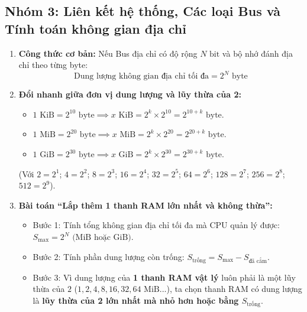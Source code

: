 \subsection{Nhóm 3: Liên kết hệ thống, Các loại Bus và Tính toán không gian địa chỉ}

\begin{tcolorbox}[bwbox, title=Quy trình giải các bài toán về Độ rộng Bus địa chỉ và Dung lượng RAM]
\begin{enumerate}
    \item \textbf{Công thức cơ bản:} Nếu Bus địa chỉ có độ rộng $N\text{ bit}$ và bộ nhớ đánh địa chỉ theo từng byte:
    $$\text{Dung lượng không gian địa chỉ tối đa} = 2^N\text{ byte}$$
    \item \textbf{Đổi nhanh giữa đơn vị dung lượng và lũy thừa của 2:}
    \begin{itemize}
        \item $1\text{ KiB} = 2^{10}\text{ byte} \implies x\text{ KiB} = 2^k \times 2^{10} = 2^{10+k}\text{ byte}$.
        \item $1\text{ MiB} = 2^{20}\text{ byte} \implies x\text{ MiB} = 2^k \times 2^{20} = 2^{20+k}\text{ byte}$.
        \item $1\text{ GiB} = 2^{30}\text{ byte} \implies x\text{ GiB} = 2^k \times 2^{30} = 2^{30+k}\text{ byte}$.
    \end{itemize}
    (Với $2 = 2^1$; $4 = 2^2$; $8 = 2^3$; $16 = 2^4$; $32 = 2^5$; $64 = 2^6$; $128 = 2^7$; $256 = 2^8$; $512 = 2^9$).
    \item \textbf{Bài toán ``Lắp thêm 1 thanh RAM lớn nhất và không thừa'':}
    \begin{itemize}
        \item Bước 1: Tính tổng không gian địa chỉ tối đa mà CPU quản lý được: $S_{\max} = 2^N\text{ (MiB hoặc GiB)}$.
        \item Bước 2: Tính phần dung lượng còn trống: $S_{\text{trống}} = S_{\max} - S_{\text{đã cắm}}$.
        \item Bước 3: Vì dung lượng của \textbf{1 thanh RAM vật lý} luôn phải là một lũy thừa của $2$ ($1, 2, 4, 8, 16, 32, 64\text{ MiB}...$), ta chọn thanh RAM có dung lượng là \textbf{lũy thừa của 2 lớn nhất mà nhỏ hơn hoặc bằng $S_{\text{trống}}$}.
    \end{itemize}
\end{enumerate}
\end{tcolorbox}

